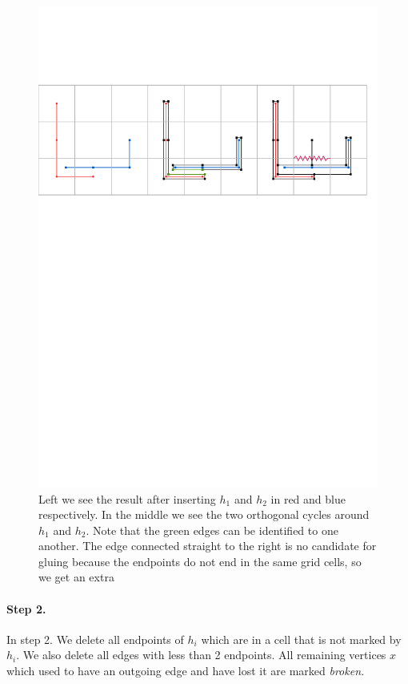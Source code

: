 \documentclass[a4paper, UKenglish]{lipics-v2018}
\begin{document}
\begin{figure}[H]
\centering
\includegraphics[page = 1]{Figures/cycle.pdf}
\caption{Left we see the result after inserting $h_1$ and $h_2$ in red and blue respectively. In the middle we see the two orthogonal cycles around $h_1$ and $h_2$. Note that the green edges can be identified to one another. The edge connected straight to the right is no candidate for gluing because the endpoints do not end in the same grid cells, so we get an extra }
\label{fig:cycle}
\end{figure}

\paragraph*{Step 2.}

In step 2. We delete all endpoints of $h_i$ which are in a cell that is not marked by $h_i$. We also delete all edges with less than 2 endpoints. All remaining vertices $x$ which used to have an outgoing edge and have lost it are marked \emph{broken.}
\end{document}
